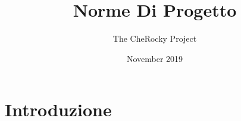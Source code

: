 \documentclass{article}
\title{Norme Di Progetto}
\author{The CheRocky Project}
\date{November 2019}
\begin{document}
\maketitle

\section{Introduzione}
    
\end{document}
